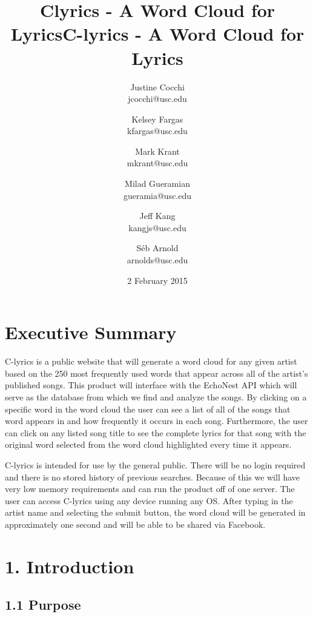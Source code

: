 \documentclass[]{article}
\title{Clyrics - A Word Cloud for Lyrics}
\author{Justine Cocchi\\jcocchi@usc.edu \and Kelsey Fargas\\kfargas@usc.edu \and Mark Krant \\ mkrant@usc.edu\and Milad Gueramian\\gueramia@usc.edu \and Jeff Kang\\kangjs@usc.edu \and Séb Arnold\\arnolds@usc.edu}
\date{2 February 2015}
\title{C-lyrics - A Word Cloud for Lyrics}
\begin{document}
\maketitle

\pagebreak

\tableofcontents
\setcounter{tocdepth}{4}

\pagebreak

\section{Executive Summary}\label{executive-summary}

C-lyrics is a public website that will generate a word cloud for any
given artist based on the 250 most frequently used words that appear
across all of the artist's published songs. This product will interface
with the EchoNest API which will serve as the database from which we
find and analyze the songs. By clicking on a specific word in the word
cloud the user can see a list of all of the songs that word appears in
and how frequently it occurs in each song. Furthermore, the user can
click on any listed song title to see the complete lyrics for that song
with the original word selected from the word cloud highlighted every
time it appears.

C-lyrics is intended for use by the general public. There will be no
login required and there is no stored history of previous searches.
Because of this we will have very low memory requirements and can run
the product off of one server. The user can access C-lyrics using any
device running any OS. After typing in the artist name and selecting the
submit button, the word cloud will be generated in approximately one
second and will be able to be shared via Facebook.

\pagebreak

\section{1. Introduction}\label{introduction}

\subsection{1.1 Purpose}\label{purpose}
\end{document}
